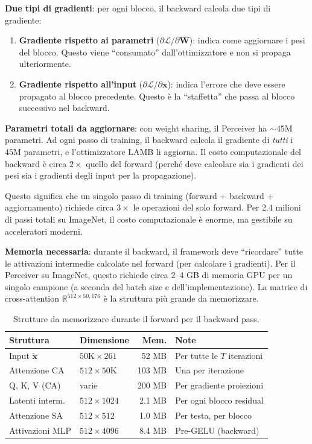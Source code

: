 \documentclass[12pt,a4paper]{article}
\begin{document}
\textbf{Due tipi di gradienti}: per ogni blocco, il backward calcola due tipi di gradiente:
\begin{enumerate}
    \item \textbf{Gradiente rispetto ai parametri} ($\partial \mathcal{L} / \partial \mathbf{W}$): indica come aggiornare i pesi del blocco. Questo viene ``consumato'' dall'ottimizzatore e non si propaga ulteriormente.
    \item \textbf{Gradiente rispetto all'input} ($\partial \mathcal{L} / \partial \mathbf{x}$): indica l'errore che deve essere propagato al blocco precedente. Questo \`e la ``staffetta'' che passa al blocco successivo nel backward.
\end{enumerate}

\textbf{Parametri totali da aggiornare}: con weight sharing, il Perceiver ha $\sim$45M parametri. Ad ogni passo di training, il backward calcola il gradiente di \emph{tutti} i 45M parametri, e l'ottimizzatore LAMB li aggiorna. Il costo computazionale del backward \`e circa $2\times$ quello del forward (perch\'e deve calcolare sia i gradienti dei pesi sia i gradienti degli input per la propagazione).

Questo significa che un singolo passo di training (forward + backward + aggiornamento) richiede circa $3\times$ le operazioni del solo forward. Per 2.4 milioni di passi totali su ImageNet, il costo computazionale \`e enorme, ma gestibile su acceleratori moderni.

\textbf{Memoria necessaria}: durante il backward, il framework deve ``ricordare'' tutte le attivazioni intermedie calcolate nel forward (per calcolare i gradienti). Per il Perceiver su ImageNet, questo richiede circa 2--4 GB di memoria GPU per un singolo campione (a seconda del batch size e dell'implementazione). La matrice di cross-attention $\mathbb{R}^{512 \times 50{,}176}$ \`e la struttura pi\`u grande da memorizzare.

\begin{table}[htbp]
\centering
\caption{Strutture da memorizzare durante il forward per il backward pass.}
\small
\begin{tabular}{@{}p{3.2cm}p{3cm}rp{4.5cm}@{}}
\toprule
\textbf{Struttura} & \textbf{Dimensione} & \textbf{Mem.} & \textbf{Note} \\
\midrule
Input $\tilde{\mathbf{x}}$ & $50\text{K} \times 261$ & 52 MB & Per tutte le $T$ iterazioni \\
Attenzione CA & $512 \times 50\text{K}$ & 103 MB & Una per iterazione \\
Q, K, V (CA) & varie & 200 MB & Per gradiente proiezioni \\
Latenti interm. & $512 \times 1024$ & 2.1 MB & Per ogni blocco residual \\
Attenzione SA & $512 \times 512$ & 1.0 MB & Per testa, per blocco \\
Attivazioni MLP & $512 \times 4096$ & 8.4 MB & Pre-GELU (backward) \\
\bottomrule
\end{tabular}
\end{table}
\end{document}
